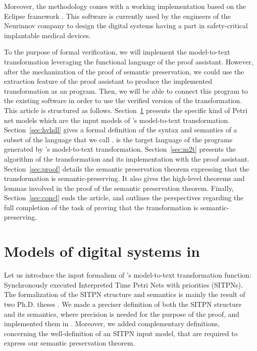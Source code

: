 \documentclass[pdflatex,sn-mathphys]{sn-jnl}%
\theoremstyle{thmstyleone}%
\theoremstyle{thmstyletwo}%
\theoremstyle{thmstylethree}%
\begin{document}
Moreover, the \hilecop{} methodology comes with a working
implementation based on the Eclipse framework . This software is
currently used by the engineers of the Neurinnov company to design the
digital systems having a part in safety-critical implantable medical
devices.

To the purpose of formal verification, we will implement the
\hilecop{} model-to-text transformation leveraging the functional
language of the \coq{} proof assistant. However, after the
mechanization of the proof of semantic preservation, we could use the
extraction feature of the \coq{} proof assistant to produce the
implemented transformation as an \ocaml{} program. Then, we will be
able to connect this program to the existing \hilecop{} software in
order
to use the verified version of the transformation.\\

This article is structured as
follows. Section~\ref{sec:hilecop-models} presents the specific kind
of Petri net models which are the input models of \hilecop{}'s
model-to-text transformation.  Section~\ref{sec:hvhdl} gives a formal
definition of the syntax and semantics of a subset of the \vhdl{}
language that we call \hvhdl{}. \hvhdl{} is the target language of the
programs generated by \hilecop{}'s model-to-text transformation.
Section~\ref{sec:m2t} presents the algorithm of the transformation and
its implementation with the \coq{} proof assistant.
Section~\ref{sec:proof} details the semantic preservation theorem
expressing that the \hilecop{} transformation is semantic-preserving.
It also gives the high-level theorems and lemmas involved in the proof
of the semantic preservation theorem.  Finally,
Section~\ref{sec:concl} ends the article, and outlines the
perspectives regarding the full completion of the task of proving that
the \hilecop{} transformation is semantic-preserving.

\section{Models of digital systems in \hilecop{}}
\label{sec:hilecop-models}

Let us introduce the input formalism of \hilecop{}'s model-to-text
transformation function: Synchronously executed Interpreted Time Petri
Nets with priorities (SITPNs). The formalization of the SITPN
structure and semantics is mainly the result of two Ph.D. theses
\cite{Leroux2014,Merzoug2018}. We made a preciser definition of both
the SITPN structure and its semantics, where precision is needed for
the purpose of the proof, and implemented them in \coq{}. Moreover, we
added complementary definitions, concerning the well-definition of an
SITPN input model, that are required to express our semantic
preservation theorem.
\end{document}
